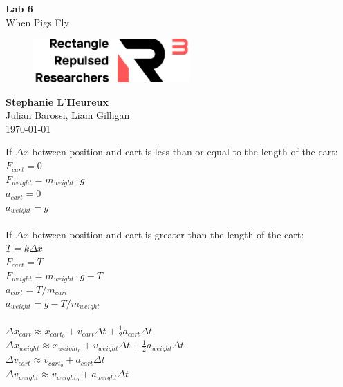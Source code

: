 \documentclass[11pt, letterpaper, includehead]{article}
\begin{document}
\begin{titlepage}
  \begin{center}
    \Huge{\textbf{Lab 6}}\\
    \Huge{When Pigs Fly}
    \vfill
    \begin{figure}[H] %
      \centering
      \includegraphics[width=6cm]{../logo.png}
    \end{figure}
    \large{\textbf{Stephanie L'Heureux}}\\
    \large{Julian Barossi, Liam Gilligan}\\
    \vspace{0.5cm}
    \normalsize
    \today
  \end{center}
\end{titlepage}

\tableofcontents
\pagebreak %

\pagestyle{fancy}
\fancyhead{}


If $\Delta x$ between position and cart is less than or equal to the length of the cart:\\
$F_{cart} = 0$\\
$F_{weight} = m_{weight}\cdot g$\\
$a_{cart} = 0$\\
$a_{weight} = g$\\\\
If $\Delta x$ between position and cart is greater than the length of the cart:\\
$T = k\Delta x$\\
$F_{cart} = T$\\
$F_{weight} = m_{weight}\cdot g - T$\\
$a_{cart} = T / m_{cart}$\\
$a_{weight} = g - T / m_{weight}$\\\\
$\Delta x_{cart} \approx x_{cart_0} + v_{cart} \Delta t + \frac{1}{2}a_{cart}\Delta t$\\
$\Delta x_{weight} \approx x_{weight_0} + v_{weight} \Delta t + \frac{1}{2}a_{weight}\Delta t$\\
$\Delta v_{cart} \approx v_{cart_0} + a_{cart}\Delta t$\\
$\Delta v_{weight} \approx v_{weight_0} + a_{weight}\Delta t$\\
\end{document}
